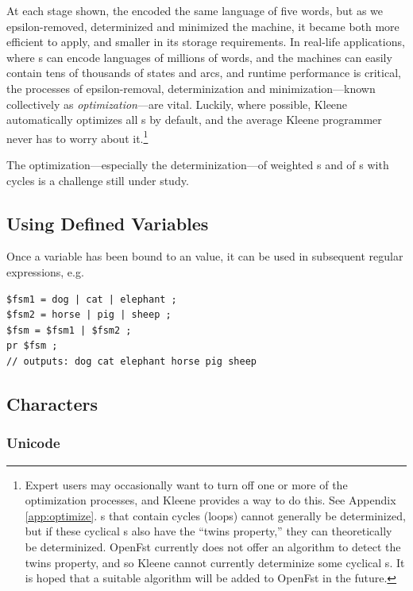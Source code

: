 \noindent
At each stage shown, the \fsm{} encoded the same language of five words, but
as we epsilon-removed, determinized and minimized the machine, it became
both more efficient to apply, and smaller in its storage requirements.  In
real-life applications, where \fsm{}s can encode languages of millions of words, and the
machines can easily contain tens of thousands of states and arcs, and
runtime performance is critical, the
processes of epsilon-removal, determinization and minimization---known
collectively as \emph{optimization}---are vital.  Luckily, where
possible, Kleene
automatically optimizes all \fsm{}s by default, and the average Kleene
programmer never has to worry about it.\footnote{Expert users may occasionally
want to turn off one or more of the optimization processes, and Kleene provides
a way to do this.  See Appendix \ref{app:optimize}.  s that
contain cycles (loops) cannot generally be determinized, but if these
cyclical
s also have the ``twins property,'' they can theoretically be
determinized.  OpenFst currently does not offer an algorithm to detect
the twins property, and so Kleene cannot currently determinize some
cyclical s.  It is hoped that a suitable algorithm will be
added to OpenFst in the future.}

The optimization---especially the determinization---of weighted \fsm{}s
and of \fsm{}s with cycles is a challenge still under study.

\subsection{Using Defined Variables}

Once a variable has been bound to an \fsm{} value, it can be used in subsequent regular
expressions, e.g.

\begin{Verbatim}
$fsm1 = dog | cat | elephant ;
$fsm2 = horse | pig | sheep ;
$fsm = $fsm1 | $fsm2 ;
pr $fsm ;
// outputs: dog cat elephant horse pig sheep
\end{Verbatim}


\subsection{Characters}

\subsubsection{Unicode}

